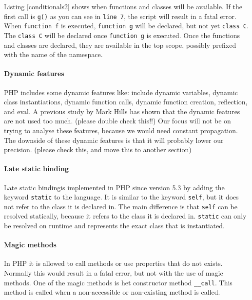 \documentclass[../main.tex]{subfiles}
\begin{document}
    Listing \ref{conditionals2} shows when functions and classes will be available.
    If the first call is \texttt{g()} as you can see in \texttt{line 7}, the script will result in a fatal error.
    When \texttt{function f} is executed, \texttt{function g} will be declared, but not yet \texttt{class C}.
    The \texttt{class C} will be declared once \texttt{function g} is executed.
    Once the functions and classes are declared, they are available in the top scope, possibly prefixed with the name of the namespace.
    

    
    \paragraph{Dynamic features}
    PHP includes some dynamic features like: include dynamic variables, dynamic class instantiations, dynamic function calls, dynamic function creation, reflection, and eval.
    A previous study by Mark Hills\cite{Hil:13} has shown that the dynamic features are not used too much. (please double check this!!) %
    Our focus will not be on trying to analyse these features, because we would need constant propagation.
    The downside of these dynamic features is that it will probably lower our precision. (please check this, and move this to another section) %
    

    \paragraph{Late static binding}
    Late static binding\footnotemark is implemented in PHP since version 5.3 by adding the keyword \texttt{static} to the language.
    It is similar to the keyword \texttt{self}, but it does not refer to the class it is declared in. 
    The main difference is that \texttt{self} can be resolved statically, because it refers to the class it is declared in.
    \texttt{static} can only be resolved on runtime and represents the exact class that is instantiated.
    
    \paragraph{Magic methods}
    In PHP it is allowed to call methods or use properties that do not exists.
    Normally this would result in a fatal error, but not with the use of magic methods.
    One of the magic methods is het constructor method \texttt{\_\_{}call}.
    This method is called when a non-accessible or non-existing method is called.
\end{document}
